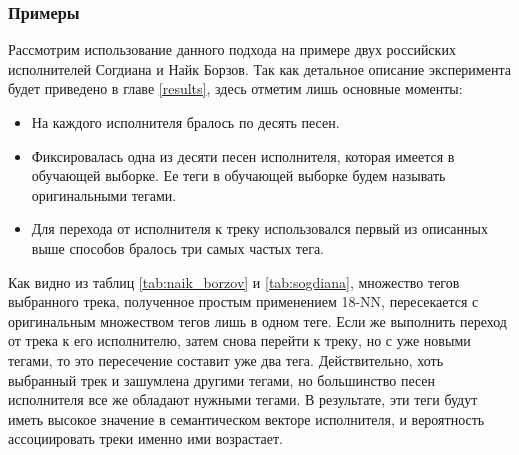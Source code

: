 \subsubsection{Примеры}

Рассмотрим использование данного подхода на примере двух российских исполнителей \ld Согдиана и Найк Борзов. Так как детальное описание эксперимента будет приведено в главе \ref{results},
здесь отметим лишь основные моменты:
\begin{itemize}
 \item На каждого исполнителя бралось по десять песен.
 \item Фиксировалась одна из десяти песен исполнителя, которая имеется в обучающей выборке. Ее теги в обучающей выборке будем называть оригинальными тегами.
 \item Для перехода от исполнителя к треку использовался первый из описанных выше способов \ld бралось три самых частых тега.
\end{itemize}

Как видно из таблиц \ref{tab:naik_borzov} и \ref{tab:sogdiana}, множество тегов выбранного трека, полученное простым применением 18-NN, 
пересекается с оригинальным множеством тегов лишь в одном теге. Если же выполнить переход от трека к его исполнителю, затем снова перейти к треку, но с уже новыми тегами,
то это пересечение составит уже два тега. Действительно, хоть выбранный трек и зашумлена другими тегами, но большинство песен исполнителя все же обладают нужными тегами.
В результате, эти теги будут иметь высокое значение в семантическом векторе исполнителя, и вероятность ассоциировать треки именно ими возрастает.

